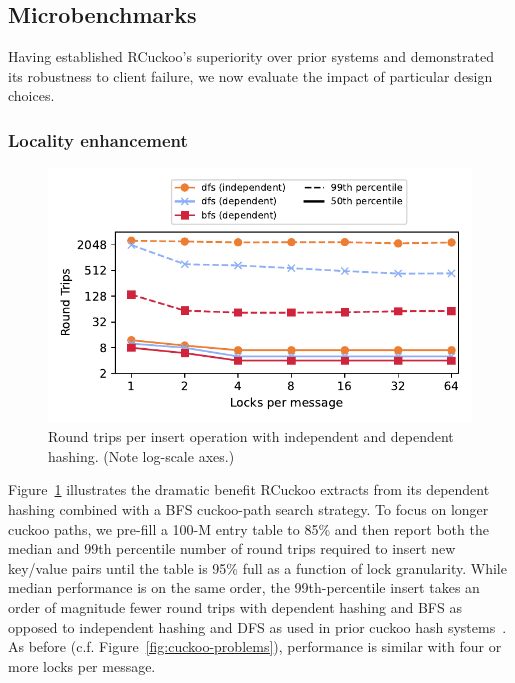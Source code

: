 \subsection{Microbenchmarks}

Having established RCuckoo's superiority over prior systems and
demonstrated its robustness to client failure, we now evaluate the
impact of particular design choices.

\subsubsection{Locality enhancement}

\begin{figure}[t]
    \includegraphics[width=0.99\linewidth]{fig/search_dependence.pdf}

    \caption{Round trips per insert operation with independent
    and dependent hashing.  (Note log-scale axes.)}

    \label{fig:search_dependence}
\end{figure}


Figure~\ref{fig:search_dependence} illustrates the dramatic benefit
RCuckoo extracts from its dependent hashing combined with a BFS
cuckoo-path search strategy.  To focus on longer cuckoo paths, we
pre-fill a 100-M entry table to 85\% and then report both the median
and 99th percentile number of round trips required to insert new
key/value pairs until the table is 95\% full as a function of lock
granularity.  While median performance is on the same order, the
99th-percentile insert takes an order of magnitude fewer round trips
with dependent hashing and BFS as opposed to independent hashing and
DFS as used in prior cuckoo hash
systems~\cite{cuckoo-improvements,pilaf,cuckoo}.  As before
(c.f. Figure~\ref{fig:cuckoo-problems}), performance is similar with
four or more locks per message.

